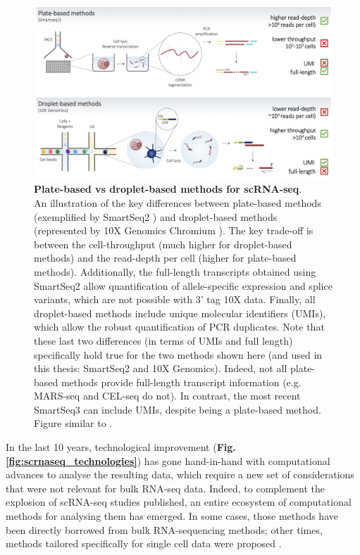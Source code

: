 \begin{figure}[h]
\centering
\includegraphics[width=16cm]{Chapter3/Fig/plate_vs_droplet.png}
\caption[scRNA-seq plate vs droplet]{\textbf{Plate-based vs droplet-based methods for scRNA-seq}.\\
An illustration of the key differences between plate-based methods (exemplified by SmartSeq2 \cite{picelli2013smart}) and droplet-based methods (represented by 10X Genomics Chromium \cite{zheng2017massively}).
The key trade-off is between the cell-throughput (much higher for droplet-based methods) and the read-depth per cell (higher for plate-based methods).
Additionally, the full-length transcripts obtained using SmartSeq2 allow quantification of allele-specific expression and splice variants, which are not possible with 3' tag 10X data.
Finally, all droplet-based methods include unique molecular identifiers (UMIs), which allow the robust quantification of PCR duplicates.
Note that these last two differences (in terms of UMIs and full length) specifically hold true for the two methods shown here (and used in this thesis: SmartSeq2 and 10X Genomics).
Indeed, not all plate-based methods provide full-length transcript information (e.g. MARS-seq \cite{jaitin2014massively} and CEL-seq \cite{hashimshony2012cel} do not).
In contrast, the most recent SmartSeq3 \cite{hagemann2020single} can include UMIs, despite being a plate-based method.
Figure similar to \cite{griffiths2018using}.}
\label{fig:scrnaseq_plate_vs_droplet}
\end{figure}

In the last 10 years, technological improvement (\textbf{Fig. \ref{fig:scrnaseq_technologies}}) has gone hand-in-hand with computational advances to analyse the resulting data, which require a new set of considerations that were not relevant for bulk RNA-seq data.
Indeed, to complement the explosion of scRNA-seq studies published, an entire ecosystem of computational methods for analysing them has emerged.
In some cases, those methods have been directly borrowed from bulk RNA-sequencing methods; other times, methods tailored specifically for single cell data were proposed \cite{stegle2015computational, zappia2018exploring, luecken2019current}.

